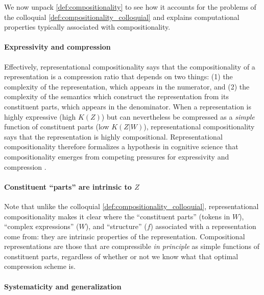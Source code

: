 \documentclass{article} %
\newcommand{\comp}{representational compositionality}
\newcommand{\Comp}{Representational compositionality}
\begin{document}
We now unpack \cref{def:compositionality} to see how it accounts for the problems of the colloquial \cref{def:compositionality_colloquial} and explains computational properties typically associated with compositionality.

\paragraph{Expressivity and compression}

Effectively, \comp{} says that the compositionality of a representation is a compression ratio that depends on two things: (1) the complexity of the representation, which appears in the numerator, and (2) the complexity of the semantics which construct the representation from its constituent parts, which appears in the denominator. When a representation is highly expressive (high $K(Z)$) but can nevertheless be compressed as a \emph{simple} function of constituent parts (low $K(Z|W)$), \comp{} says that the representation is highly compositional. \Comp{} therefore formalizes a hypothesis in cognitive science that compositionality emerges from competing pressures for expressivity and compression \citep[e.g.,][and references therein]{kirby1999function,kirby2004ug,kirby2008cumulative}.

\paragraph{Constituent ``parts'' are intrinsic to $Z$}

Note that unlike the colloquial \cref{def:compositionality_colloquial}, \comp{} makes it clear where the ``constituent parts'' (tokens in $W$), ``complex expressions'' ($W$), and ``structure'' ($f$) associated with a representation come from: they are intrinsic properties of the representation. Compositional representations are those that are compressible \emph{in principle} as simple functions of constituent parts, regardless of whether or not we know what that optimal compression scheme is.

\paragraph{Systematicity and generalization}
\end{document}
